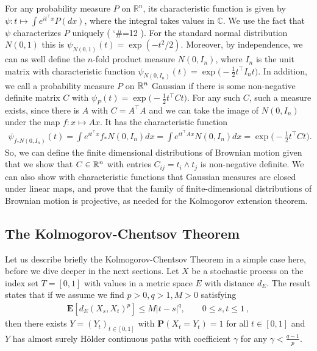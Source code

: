 \documentclass[lean]{Draft}
\makeatletter
\newcommand\leanlink{\begingroup\catcode`\#=12\relax\@leanlink}
\newcommand\@leanlink[2]{\endgroup
\href{#1}
{\texttt{\detokenize{#2}}}}
\newcommand{\docs}[1]{%
\leanlink{https://remydegenne.github.io/brownian-motion/docs/find/?pattern=#1\#doc}
{#1}}
\makeatother
\begin{document}
For any probability measure $P$ on $\mathbb R^n$, its characteristic function is given by $\psi: t \mapsto \int e^{it^\top x} P(dx)$, where the integral takes values in $\mathbb C$. We use the fact that $\psi$ characterizes $P$ uniquely (\docs{MeasureTheory.Measure.ext_of_charFun}).
For the standard normal distribution $N(0,1)$ this is $\psi_{N(0,1)}(t) = \exp(-t^2/2)$.
Moreover, by independence, we can as well define the $n$-fold product measure $N(0, I_n)$, where $I_n$ is the unit matrix with characteristic function $\psi_{N(0,I_n)}(t) = \exp\big(-\tfrac 12 t^\top I_n t\big)$.
In addition, we call a probability measure $P$ on $\mathbb{R}^n$ Gaussian if there is some non-negative definite matrix $C$ with $\psi_P(t) = \exp\big( - \tfrac 12 t^\top C t\big)$. For any such $C$, such a measure exists, since there is $A$ with $C = A^\top A$ and we can take the image of $N(0,I_n)$ under the map $f : x\mapsto Ax$. It has the characteristic function
\begin{align} \label{eq:gausslin}
\psi_{f_\ast N(0,I_n)}(t) = \int e^{it^\top x} f_\ast N(0,I_n) dx = \int e^{it^\top A x} N(0,I_n) dx = \exp\big( - \tfrac 12 t^\top C t\big).
\end{align}
So, we can define the finite dimensional distributions of Brownian motion given that we show that $C \in \mathbb{R}^n$ with entries $C_{ij} = t_i \wedge t_j$ is non-negative definite.
We can also show with characteristic functions that Gaussian measures are closed under linear maps, and prove that the family of finite-dimensional distributions of Brownian motion is projective, as needed for the Kolmogorov extension theorem.


\subsection{The Kolmogorov-Chentsov Theorem}
Let us describe briefly the Kolmogorov-Chentsov Theorem in a simple case here, before we dive deeper in the next sections.
Let $X$ be a stochastic process on the index set $T = [0,1]$ with values in a metric space $E$ with distance $d_E$.
The result states that if we assume we find $p>0, q>1, M > 0$ satisfying
\begin{align}
\label{eq:cs}
  \mathbf E[d_E(X_s, X_t)^p] \leq M|t-s|^q, \qquad 0\leq s,t\leq 1\:,
\end{align}
then there exists $Y = (Y_t)_{t\in [0,1]}$ with $\mathbf P(X_t = Y_t) = 1$ for all $t\in [0,1]$ and $Y$ has almost surely Hölder continuous paths with coefficient $\gamma$ for any $\gamma < \tfrac {q-1} p$.
\end{document}

